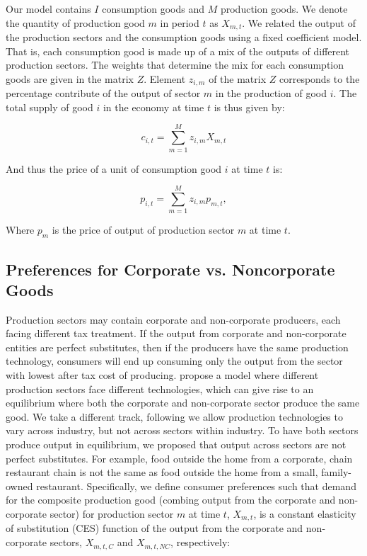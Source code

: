     Our model contains $I$ consumption goods and $M$ production goods.  We denote the quantity of production good $m$ in period $t$ as $X_{m,t}$.  We related the output of the production sectors and the consumption goods using a fixed coefficient model. That is, each consumption good is made up of a mix of the outputs of different production sectors.  The weights that determine the mix for each consumption goods are given in the matrix $Z$.  Element $z_{i,m}$ of the matrix $Z$ corresponds to the percentage contribute of the output of sector $m$ in the production of good $i$.  The total supply of good $i$ in the economy at time $t$ is thus given by: 
    
             \begin{equation} \label{eqn:mix_cons}
             c_{i,t} = \sum_{m=1}^{M}z_{i,m}X_{m,t} 
    	\end{equation}
	
	And thus the price of a unit of consumption good $i$ at time $t$ is:
	
             \begin{equation} \label{eqn:mix_cons_price}
             p_{i,t} = \sum_{m=1}^{M}z_{i,m}p_{m,t}, 
    	\end{equation}
    
    Where $p_{m}$ is the price of output of production sector $m$ at time $t$.
    
    \subsection{Preferences for Corporate vs. Noncorporate Goods}\label{sec:pref_corp_noncorp}
    
    Production sectors may contain corporate and non-corporate producers, each facing different tax treatment.  If the output from corporate and non-corporate entities are perfect substitutes, then if the producers have the same production technology, consumers will end up consuming only the output from the sector with lowest after tax cost of producing.  \citet{GK1989} propose a model where different production sectors face different technologies, which can give rise to an equilibrium where both the corporate and non-corporate sector produce the same good.  We take a different track, following \citet{FR1993} we allow production technologies to vary across industry, but not across sectors within industry.  To have both sectors produce output in equilibrium, we proposed that output across sectors are not perfect substitutes.  For example, food outside the home from a corporate, chain restaurant chain is not the same as food outside the home from a small, family-owned restaurant.  Specifically, we define consumer preferences such that demand for the composite production good (combing output from the corporate and non-corporate sector) for production sector $m$ at time $t$, $X_{m,t}$, is a constant elasticity of substitution (CES) function of the output from the corporate and non-corporate sectors, $X_{m,t,C}$ and $X_{m,t,NC}$, respectively:
    
